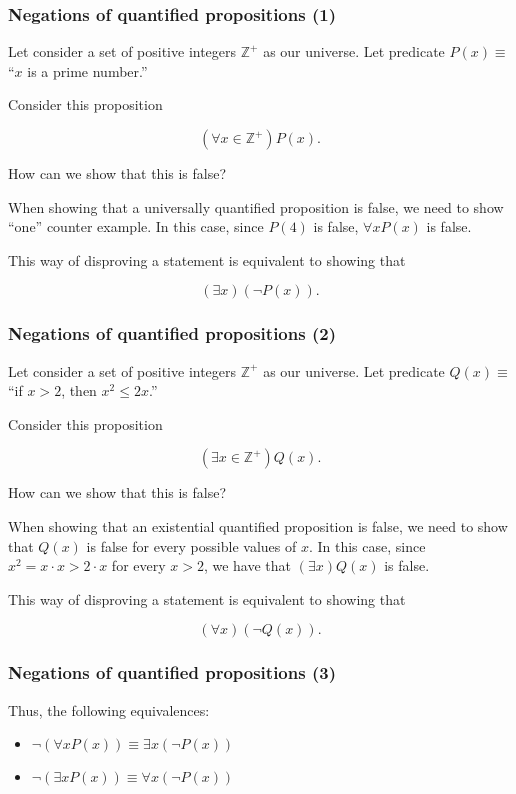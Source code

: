 \begin{frame}\frametitle{Negations of quantified propositions (1)}
  Let consider a set of positive integers $\mathbb Z^+$ as our
  universe.  Let predicate $P(x)\equiv$ ``$x$ is a prime number.''

  Consider this proposition

  \[(\forall x\in {\mathbb Z^+}) P(x).\]

  How can we show that this is false? \pause

  When showing that a universally quantified proposition is false, we
  need to show ``one'' counter example.  In this case, since $P(4)$ is
  false, $\forall x P(x)$ is false.  \pause

  This way of disproving a statement is equivalent to showing that

  \[(\exists x)(\neg P(x)).\]
\end{frame}

\begin{frame}\frametitle{Negations of quantified propositions (2)}
  Let consider a set of positive integers $\mathbb Z^+$ as our
  universe.  Let predicate $Q(x)\equiv$ ``if $x > 2$, then  $x^2\leq 2x$.''

  Consider this proposition

  \[(\exists x\in {\mathbb Z^+}) Q(x).\]

  How can we show that this is false? \pause

  When showing that an existential quantified proposition is false, we
  need to show that $Q(x)$ is false for every possible values of $x$.
  In this case, since $x^2 = x\cdot x > 2\cdot x$ for every $x>2$, we
  have that $(\exists x) Q(x)$ is false. \pause

  This way of disproving a statement is equivalent to showing that

  \[(\forall x)(\neg Q(x)).\]
\end{frame}

\begin{frame}\frametitle{Negations of quantified propositions (3)}
  Thus, the following equivalences:

  \begin{itemize}
  \item $\neg(\forall x P(x)) \equiv \exists x (\neg P(x))$
  \item $\neg(\exists x P(x)) \equiv \forall x (\neg P(x))$
  \end{itemize}
\end{frame}

